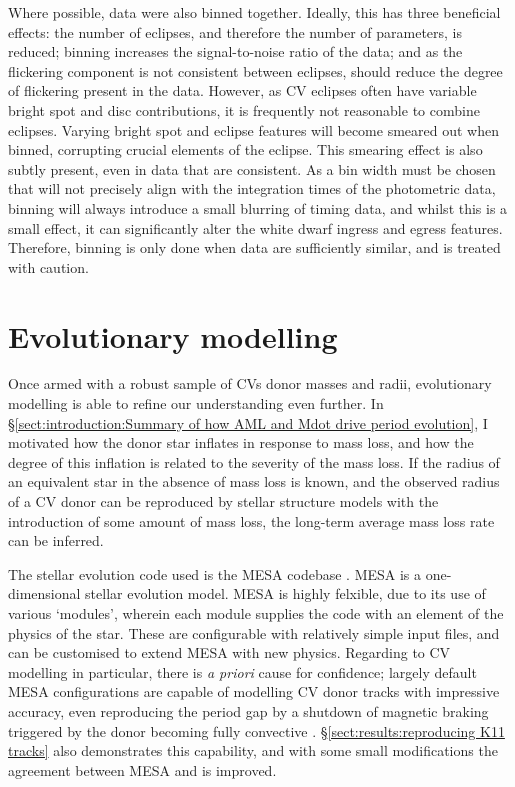 Where possible, data were also binned together. Ideally, this has three beneficial effects: the number of eclipses, and therefore the number of parameters, is reduced; binning increases the signal-to-noise ratio of the data; and as the flickering component is not consistent between eclipses, should reduce the degree of flickering present in the data. However, as CV eclipses often have variable bright spot and disc contributions, it is frequently not reasonable to combine eclipses. Varying bright spot and eclipse features will become smeared out when binned, corrupting crucial elements of the eclipse.
This smearing effect is also subtly present, even in data that are consistent. As a bin width must be chosen that will not precisely align with the integration times of the photometric data, binning will always introduce a small blurring of timing data, and whilst this is a small effect, it can significantly alter the white dwarf ingress and egress features.
Therefore, binning is only done when data are sufficiently similar, and is treated with caution.



\section{Evolutionary modelling}
\label{sect:modelling:evolutionary modelling}

Once armed with a robust sample of CVs donor masses and radii, evolutionary modelling is able to refine our understanding even further. In \S\ref{sect:introduction:Summary of how AML and Mdot drive period evolution}, I motivated how the donor star inflates in response to mass loss, and how the degree of this inflation is related to the severity of the mass loss.
If the radius of an equivalent star in the absence of mass loss is known, and the observed radius of a CV donor can be reproduced by stellar structure models with the introduction of some amount of mass loss, the long-term average mass loss rate can be inferred.

The stellar evolution code used is the MESA codebase \citep{paxton2011,paxton2013,Paxton_2015,paxton2019}. MESA is a one-dimensional stellar evolution model. MESA is highly felxible, due to its use of various `modules', wherein each module supplies the code with an element of the physics of the star. These are configurable with relatively simple input files, and can be customised to extend MESA with new physics.
Regarding to CV modelling in particular, there is \textit{a priori} cause for confidence; largely default MESA configurations are capable of modelling CV donor tracks with impressive accuracy, even reproducing the period gap by a shutdown of magnetic braking triggered by the donor becoming fully convective \citep{Paxton_2015}.
\S\ref{sect:results:reproducing K11 tracks} also demonstrates this capability, and with some small modifications the agreement between MESA and \citet{knigge11} is improved.

